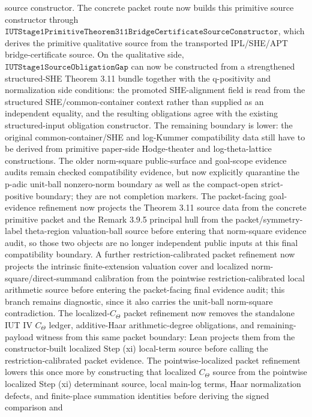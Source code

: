 \documentclass[11pt]{article}
\theoremstyle{plain}
\theoremstyle{definition}
\theoremstyle{remark}
\begin{document}
source constructor.  The concrete packet route now builds this primitive source
constructor through
\(\texttt{IUTStage1PrimitiveTheorem311BridgeCertificateSourceConstructor}\),
which derives the primitive qualitative source from the transported
IPL/SHE/APT bridge-certificate source.
On the
qualitative side,
\(\texttt{IUTStage1SourceObligationGap}\) can now be constructed from a
strengthened structured-SHE Theorem 3.11 bundle together with the q-positivity
and normalization side conditions: the promoted SHE-alignment field is read
from the structured SHE/common-container context rather than supplied as an
independent equality, and the resulting obligations agree with the existing
structured-input obligation constructor.  The remaining boundary is lower: the
original common-container/SHE and log-Kummer compatibility data still have to be
derived from primitive paper-side Hodge-theater and log-theta-lattice
constructions.  The older norm-square public-surface and goal-scope evidence
audits remain checked compatibility evidence, but now explicitly quarantine
the p-adic unit-ball nonzero-norm boundary as well as the compact-open
strict-positive boundary; they are not completion markers.  The packet-facing
goal-evidence refinement now projects the Theorem 3.11 source data from the
concrete primitive packet and the Remark 3.9.5 principal hull from the
packet/symmetry-label theta-region valuation-ball source before entering that
norm-square evidence audit, so those two objects are no longer independent
public inputs at this final compatibility boundary.  A further
restriction-calibrated packet refinement now projects the intrinsic
finite-extension valuation cover and localized norm-square/direct-summand
calibration from the pointwise restriction-calibrated local arithmetic source
before entering the packet-facing final evidence audit; this branch remains
diagnostic, since it also carries the unit-ball norm-square contradiction.
The localized-\(C_\Theta\) packet refinement now removes the standalone IUT IV
\(C_\Theta\) ledger, additive-Haar arithmetic-degree obligations, and
remaining-payload witness from this same packet boundary: Lean projects them
from the constructor-built localized Step (xi) local-term source before calling
the restriction-calibrated packet evidence.
The pointwise-localized packet refinement lowers this once more by constructing
that localized \(C_\Theta\) source from the pointwise localized Step (xi)
determinant source, local main-log terms, Haar normalization defects, and
finite-place summation identities before deriving the signed comparison and
\end{document}
